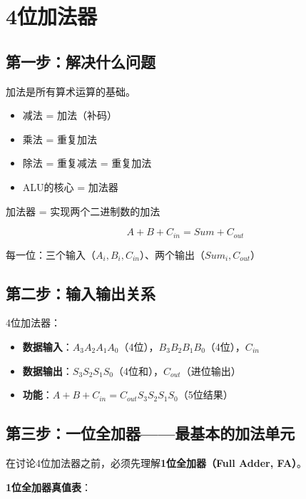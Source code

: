 \chapter{4位加法器}

\section{第一步：解决什么问题}

加法是所有算术运算的基础。

\begin{itemize}
  \item 减法 = 加法（补码）
  \item 乘法 = 重复加法
  \item 除法 = 重复减法 = 重复加法
  \item ALU的核心 = 加法器
\end{itemize}

\begin{keypoint}[加法器的本质]
加法器 = 实现两个二进制数的加法

$$A + B + C_{in} = Sum + C_{out}$$

每一位：三个输入（$A_i, B_i, C_{in}$）、两个输出（$Sum_i, C_{out}$）
\end{keypoint}

\section{第二步：输入输出关系}

4位加法器：

\begin{itemize}
  \item \textbf{数据输入}：$A_3A_2A_1A_0$（4位），$B_3B_2B_1B_0$（4位），$C_{in}$
  \item \textbf{数据输出}：$S_3S_2S_1S_0$（4位和），$C_{out}$（进位输出）
  \item \textbf{功能}：$A + B + C_{in} = C_{out}S_3S_2S_1S_0$（5位结果）
\end{itemize}

\section{第三步：一位全加器——最基本的加法单元}

在讨论4位加法器之前，必须先理解\textbf{1位全加器（Full Adder, FA）}。

\textbf{1位全加器真值表}：

